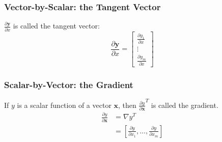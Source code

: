 \documentclass{beamer}
\begin{document}

\begin{frame}
  \frametitle{Vector-by-Scalar: the Tangent Vector}

  $\frac{\partial\mathbf{y}}{\partial x}$ is called the tangent vector:
  \begin{displaymath}
    \frac{\partial\mathbf{y}}{\partial x}=
    \left[\begin{array}{c}
        \frac{\partial y_1}{\partial x}\\
        \vdots\\
        \frac{\partial y_m}{\partial x}
      \end{array}\right]
  \end{displaymath}
\end{frame}

\begin{frame}
  \frametitle{Scalar-by-Vector: the Gradient}

  If $y$ is a scalar function of a vector $\mathbf{x}$, then
  $\frac{\partial y}{\partial\mathbf{x}}^T$ is called the gradient.
  \begin{align*}
    \frac{\partial y}{\partial\mathbf{x}}& =\nabla y^T\\
    &=\left[\frac{\partial y}{\partial x_1},\ldots,\frac{\partial y}{\partial x_m}\right]
  \end{align*}
\end{frame}
\end{document}
